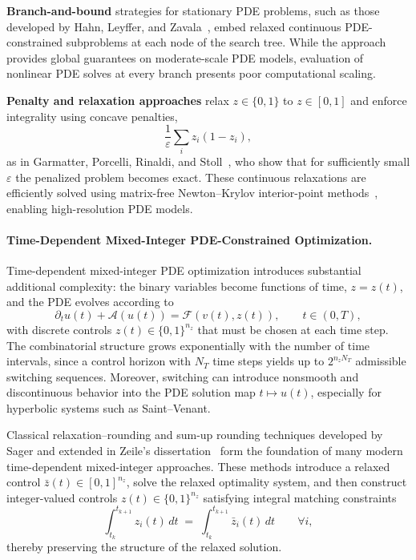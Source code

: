 \documentclass{article}
\newcommand{\1}{\mathds{1}}          %
\theoremstyle{definition}
\begin{document}
\begin{sloppypar}
{\bf Branch-and-bound} strategies for stationary PDE problems, such as those developed by
Hahn, Leyffer, and Zavala~\cite{hahn2017mixed}, embed relaxed continuous PDE-constrained subproblems at each node of the search tree. While the approach provides global guarantees on moderate-scale PDE models, evaluation of nonlinear PDE solves at every branch presents poor computational scaling.

{\bf Penalty and relaxation approaches} relax $z\in\{0,1\}$ to $z\in[0,1]$ and enforce
integrality using concave penalties,
\[
\frac{1}{\varepsilon}\sum_i z_i(1-z_i),
\]
as in Garmatter, Porcelli, Rinaldi, and Stoll~\cite{garmatter2022improved}, who show
that for sufficiently small $\varepsilon$ the penalized problem becomes exact.
These continuous relaxations are efficiently solved using matrix-free Newton--Krylov
interior-point methods~\cite{heinkenschloss2014matrix}, enabling high-resolution PDE models.

\paragraph{Time-Dependent Mixed-Integer PDE-Constrained Optimization.}
Time-dependent mixed-integer PDE optimization introduces substantial additional complexity:
the binary variables become functions of time, $z=z(t)$, and the PDE evolves according to
\[
\partial_t u(t) + \mathcal{A}(u(t)) = \mathcal{F}(v(t),z(t)),
\qquad t\in(0,T),
\]
with discrete controls $z(t)\in\{0,1\}^{n_z}$ that must be chosen at each time step.
The combinatorial structure grows exponentially with the number of time intervals, since
a control horizon with $N_T$ time steps yields up to $2^{n_z N_T}$ admissible switching
sequences. Moreover, switching can introduce nonsmooth and discontinuous behavior into the
PDE solution map $t\mapsto u(t)$, especially for hyperbolic systems such as Saint--Venant.

Classical relaxation--rounding and sum-up rounding techniques developed by Sager
\cite{sager2005} and extended in Zeile's dissertation~\cite{zeile2021combinatorial} form the foundation of many modern time-dependent mixed-integer approaches. These methods introduce a relaxed control $\bar{z}(t)\in[0,1]^{n_z}$, solve the relaxed optimality system, and then
construct integer-valued controls $z(t)\in\{0,1\}^{n_z}$ satisfying integral matching
constraints
\[
\int_{t_k}^{t_{k+1}} z_i(t)\,dt \;=\; 
\int_{t_k}^{t_{k+1}} \bar{z}_i(t)\,dt \qquad \forall i,
\]
thereby preserving the structure of the relaxed solution.


\end{sloppypar}
\end{document}
